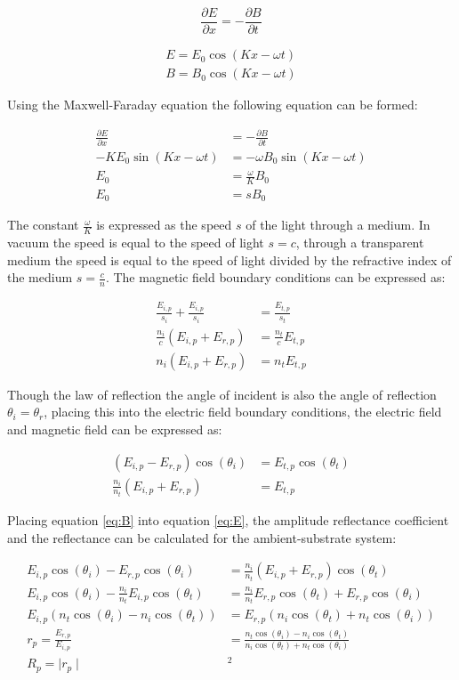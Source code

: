\documentclass[MasterThesisMain.tex]{subfiles}
\begin{document}
\begin{equation}
\frac{\partial E}{\partial x} = - \frac{\partial B}{\partial t}
\end{equation}

\begin{align}
E = E_0 \cos{(Kx-\omega t)}\\
B = B_0 \cos{(Kx-\omega t)}
\end{align}

Using the Maxwell-Faraday equation the following equation can be formed:

\begin{align}
\frac{\partial E}{\partial x} &= - \frac{\partial B}{\partial t}\\
-K E_0 \sin{(Kx-\omega t)} &= -\omega B_0 \sin{(Kx-\omega t)}\\
E_0 &= \frac{\omega}{K} B_0\\
E_0 &= s B_0
\end{align} 

The constant $\frac{\omega}{K}$ is expressed as the speed $s$ of the light through a medium. In vacuum the speed is equal to the speed of light $s=c$, through a transparent medium the speed is equal to the speed of light divided by the refractive index of the medium $s =\frac{c}{n}$. The magnetic field boundary conditions can be expressed as:

\begin{align}
\frac{E_{i,p}}{s_i} + \frac{E_{i,p}}{s_i} &= \frac{E_{t,p}}{s_t}\\
\frac{n_i}{c}(E_{i,p}+E_{r,p}) &= \frac{n_t}{c}E_{t,p}\\
n_i(E_{i,p}+E_{r,p}) &= n_tE_{t,p}
\end{align} 

Though the law of reflection the angle of incident is also the angle of reflection $\theta_i=\theta_r$, placing this into the electric field boundary conditions, the electric field and magnetic field can be expressed as:

\begin{align}
(E_{i,p}-E_{r,p})\cos(\theta_i) &= E_{t,p}\cos(\theta_t) \label{eq:E}\\
\frac{n_i}{n_t}(E_{i,p}+E_{r,p}) &= E_{t,p} \label{eq:B}
\end{align}

Placing equation \ref{eq:B} into equation \ref{eq:E}, the amplitude reflectance coefficient and the reflectance can be calculated for the ambient-substrate system:

\begin{align}
E_{i,p}\cos(\theta_i)-E_{r,p}\cos(\theta_i) &= \frac{n_i}{n_t}(E_{i,p}+E_{r,p}) \cos(\theta_t) \\
E_{i,p}\cos(\theta_i) - \frac{n_i}{n_t}E_{i,p} \cos(\theta_t) &= \frac{n_i}{n_t}E_{r,p} \cos(\theta_t) + E_{r,p} \cos(\theta_i)\\
E_{i,p}(n_t\cos(\theta_i)-n_i\cos(\theta_t)) &= E_{r,p}(n_i\cos(\theta_t)+n_t\cos(\theta_i))\\
r_p = \frac{E_{r,p}}{E_{i,p}} &= \frac{n_t\cos(\theta_i)-n_i\cos(\theta_t)}{n_i\cos(\theta_t)+n_t\cos(\theta_i)}\\
R_p = \mid r_p \mid &^2 
\end{align}
\end{document}
